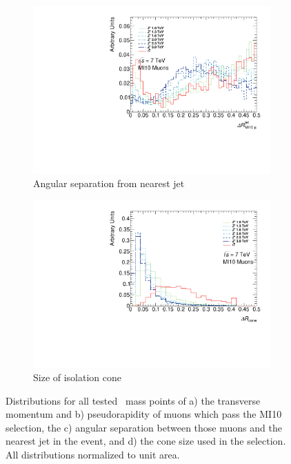 \begin{figure}[htbp]
  \begin{subfigure}{0.48\textwidth}
    \includegraphics[width=\textwidth]{PartBoosted/Plots/h_mi10_jet_dr.pdf}
    \caption{Angular separation from nearest jet} \label{fig:BoostedControlMI10Dr}
  \end{subfigure}
  \begin{subfigure}{0.48\textwidth}
    \includegraphics[width=\textwidth]{PartBoosted/Plots/h_mi10_coneSize.pdf}
    \caption{Size of isolation cone} \label{fig:BoostedControlMI10Cone}
  \end{subfigure}

  \caption[Distributions for all tested \Zprime\ mass points of the transverse momentum and pseudorapidity of muons which pass the MI10 selection, the angular separation between those muons and the nearest jet in the event, and the cone size used in the selection.]{Distributions for all tested \Zprime\ mass points of a) the transverse momentum and b) pseudorapidity of muons which pass the MI10 selection, the c) angular separation between those muons and the nearest jet in the event, and d) the cone size used in the selection. All distributions normalized to unit area.} \label{fig:BoostedControlMI10}
\end{figure}

